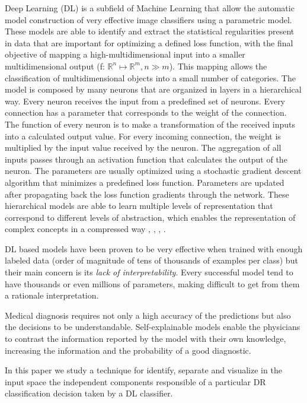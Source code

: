\documentclass{llncs}
\begin{document}
Deep Learning (DL) is a subfield of Machine Learning that allow the automatic model construction of very effective image classifiers using a parametric model. These models are able to identify and extract the statistical regularities present in data that are important for optimizing a defined loss function, with the final objective of mapping a high-multidimensional input into a smaller multidimensional output (f: $\mathbb{R}^{n} \mapsto \mathbb{R}^{m}, n \gg m$). This mapping allows the classification of multidimensional objects into a small number of categories. The model is composed by many neurons that are organized in layers in a hierarchical way. Every neuron receives the input from a predefined set of neurons. Every connection has a parameter that corresponds to the weight of the connection. The function of every neuron is to make a transformation of the received inputs into a calculated output value. For every incoming connection, the weight is multiplied by the input value received by the neuron. The aggregation of all inputs passes through an activation function that calculates the output of the neuron. The parameters are usually optimized using a stochastic gradient descent algorithm that minimizes a predefined loss function. Parameters are updated after propagating back the loss function gradients through the network. These hierarchical models are able to learn multiple levels of representation that correspond to different levels of abstraction, which enables the representation of complex concepts in a compressed way \cite{nature-deep-learning}, \cite{888}, \cite{Bengio:2013:RLR:2498740.2498889}, \cite{bengio-2009}.

DL based models have been proven to be very effective when trained with enough labeled data (order of magnitude of tens of thousands of examples per class) but their main concern is its \emph{lack of interpretability}. Every successful model tend to have thousands or even millions of parameters, making difficult to get from them a rationale interpretation. 

Medical diagnosis requires not only a high accuracy of the predictions but also the decisions to be understandable. Self-explainable models enable the physicians to contrast the information reported by the model with their own knowledge, increasing the information and the probability of a good diagnostic.  

In this paper we study a technique for identify, separate and visualize in the input space the independent components responsible of a particular DR classification decision taken by a DL classifier. 
\end{document}
